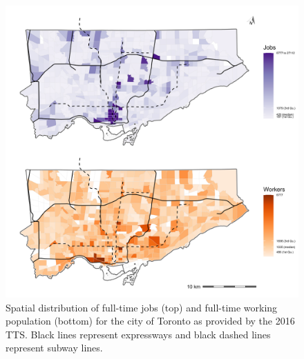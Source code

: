 \documentclass[]{elsarticle} %
\begin{document}
\begin{figure}
\includegraphics[width=1\linewidth]{images/spatial-dist-jobs-pop-Toronto-plot} \caption{\label{fig:s-dist-Toronto-plot}  Spatial distribution of full-time jobs (top) and full-time working population (bottom) for the city of Toronto as provided by the 2016 TTS. Black lines represent expressways and black dashed lines represent subway lines.}\label{fig:spatial-dist-Toronto-plot}
\end{figure}
\end{document}
